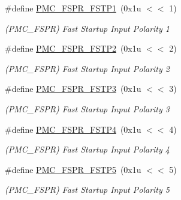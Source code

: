\begin{DoxyCompactItemize}
\mbox{\label{group__SAME70__PMC_ga8e7974990c3071500c1e5fab42781591}} 
\#define \mbox{\hyperlink{group__SAME70__PMC_ga8e7974990c3071500c1e5fab42781591}{P\+M\+C\+\_\+\+F\+S\+P\+R\+\_\+\+F\+S\+T\+P1}}~(0x1u $<$$<$ 1)
\begin{DoxyCompactList}\small\item\em (P\+M\+C\+\_\+\+F\+S\+PR) Fast Startup Input Polarity 1 \end{DoxyCompactList}\item 
\mbox{\label{group__SAME70__PMC_gaf932ab6bc83c9041e57bf1670f477385}} 
\#define \mbox{\hyperlink{group__SAME70__PMC_gaf932ab6bc83c9041e57bf1670f477385}{P\+M\+C\+\_\+\+F\+S\+P\+R\+\_\+\+F\+S\+T\+P2}}~(0x1u $<$$<$ 2)
\begin{DoxyCompactList}\small\item\em (P\+M\+C\+\_\+\+F\+S\+PR) Fast Startup Input Polarity 2 \end{DoxyCompactList}\item 
\mbox{\label{group__SAME70__PMC_ga1d8ee2db1a6fdb081cb43a505f13f69e}} 
\#define \mbox{\hyperlink{group__SAME70__PMC_ga1d8ee2db1a6fdb081cb43a505f13f69e}{P\+M\+C\+\_\+\+F\+S\+P\+R\+\_\+\+F\+S\+T\+P3}}~(0x1u $<$$<$ 3)
\begin{DoxyCompactList}\small\item\em (P\+M\+C\+\_\+\+F\+S\+PR) Fast Startup Input Polarity 3 \end{DoxyCompactList}\item 
\mbox{\label{group__SAME70__PMC_gace394bf7a6669894004a5686b22314ee}} 
\#define \mbox{\hyperlink{group__SAME70__PMC_gace394bf7a6669894004a5686b22314ee}{P\+M\+C\+\_\+\+F\+S\+P\+R\+\_\+\+F\+S\+T\+P4}}~(0x1u $<$$<$ 4)
\begin{DoxyCompactList}\small\item\em (P\+M\+C\+\_\+\+F\+S\+PR) Fast Startup Input Polarity 4 \end{DoxyCompactList}\item 
\mbox{\label{group__SAME70__PMC_gafe90d4e41210a882dd735eb1805cc6ca}} 
\#define \mbox{\hyperlink{group__SAME70__PMC_gafe90d4e41210a882dd735eb1805cc6ca}{P\+M\+C\+\_\+\+F\+S\+P\+R\+\_\+\+F\+S\+T\+P5}}~(0x1u $<$$<$ 5)
\begin{DoxyCompactList}\small\item\em (P\+M\+C\+\_\+\+F\+S\+PR) Fast Startup Input Polarity 5 \end{DoxyCompactList}\item 
$$
\end{DoxyCompactItemize}
